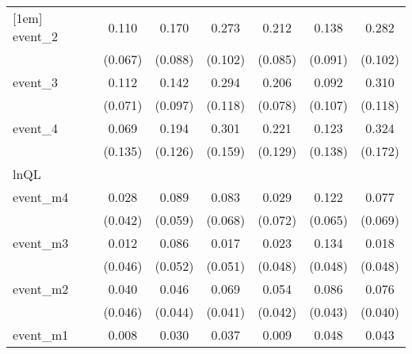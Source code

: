 {\begin{tabular}{l*{6}{c}}
[1em]
event\_2     &       0.110         &       0.170         &       0.273\sym{**} &       0.212\sym{*}  &       0.138         &       0.282\sym{**} \\
            &     (0.067)         &     (0.088)         &     (0.102)         &     (0.085)         &     (0.091)         &     (0.102)         \\
[1em]
event\_3     &       0.112         &       0.142         &       0.294\sym{*}  &       0.206\sym{**} &       0.092         &       0.310\sym{**} \\
            &     (0.071)         &     (0.097)         &     (0.118)         &     (0.078)         &     (0.107)         &     (0.118)         \\
[1em]
event\_4     &       0.069         &       0.194         &       0.301         &       0.221         &       0.123         &       0.324         \\
            &     (0.135)         &     (0.126)         &     (0.159)         &     (0.129)         &     (0.138)         &     (0.172)         \\
\hline
lnQL        &                     &                     &                     &                     &                     &                     \\
event\_m4    &       0.028         &       0.089         &       0.083         &       0.029         &       0.122         &       0.077         \\
            &     (0.042)         &     (0.059)         &     (0.068)         &     (0.072)         &     (0.065)         &     (0.069)         \\
[1em]
event\_m3    &       0.012         &       0.086         &       0.017         &       0.023         &       0.134\sym{**} &       0.018         \\
            &     (0.046)         &     (0.052)         &     (0.051)         &     (0.048)         &     (0.048)         &     (0.048)         \\
[1em]
event\_m2    &       0.040         &       0.046         &       0.069         &       0.054         &       0.086\sym{*}  &       0.076         \\
            &     (0.046)         &     (0.044)         &     (0.041)         &     (0.042)         &     (0.043)         &     (0.040)         \\
[1em]
event\_m1    &       0.008         &       0.030         &       0.037         &       0.009         &       0.048         &       0.043         \\

\end{tabular}}
